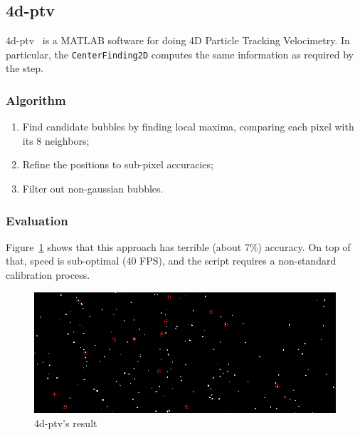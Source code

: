 \subsection{4d-ptv}
\label{sec:locate:fourdptv}

4d-ptv~\cite{fourdptv} is a MATLAB software for doing 4D Particle Tracking Velocimetry.
In particular, the \texttt{CenterFinding2D} computes the same information as required by the \locate* step.

\subsubsection{Algorithm}

\begin{enumerate}
	\itemsep 0em
	\item Find candidate bubbles by finding local maxima, comparing each pixel with its 8 neighbors;
	\item Refine the positions to sub-pixel accuracies;
	\item Filter out non-gaussian bubbles.
\end{enumerate}

\subsubsection{Evaluation}

Figure~\ref{fig:locate:fourdptv} shows that this approach has terrible (about 7\%) accuracy.
On top of that, speed is sub-optimal (40 FPS), and the script requires a non-standard calibration process.

\begin{figure}
	\centerline{\includegraphics[width=\locateimgsize]{images/locate/4d-ptv.png}}
	\caption{\centering 4d-ptv's result}
	\label{fig:locate:fourdptv}
\end{figure}
